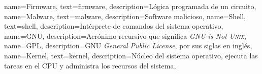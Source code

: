 {
  name={Firmware},
  text={firmware},
  description={L\'{o}gica programada de un circuito},
}
{
  name={Malware},
  text={malware},
  description={\Gls{Software} malicioso},
}
{
  name={Shell},
  text={shell},
  description={Int\'{e}rprete de comandos del sistema operativo},
}
{
  name={GNU},
  description={Acr\'{o}nimo recursivo que significa \textit{GNU is Not \textsc{Unix}}},
}
{
  name={GPL},
  description={\gls{GNU} \textit{General Public License}, por sus siglas en ingl\'{e}s},
}
{
  name=Kernel,
  text=kernel,
  description={N\'{u}cleo del sistema operativo, ejecuta las tareas en el CPU y administra los recursos del sistema},
}

